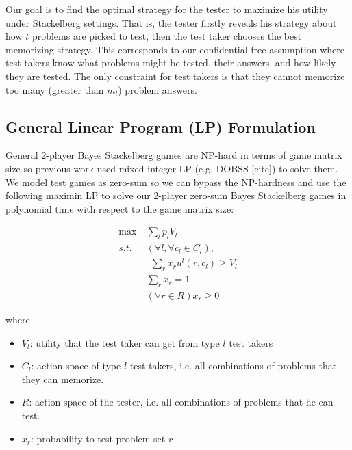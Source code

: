 \documentclass{article}
\begin{document}
Our goal is to find the optimal strategy for the tester to maximize his utility
under Stackelberg settings. That is, the tester firstly reveals his strategy
about how $t$ problems are picked to test, then the test taker chooses the best
memorizing strategy. This corresponds to our confidential-free assumption where
test takers know what problems might be tested, their answers, and how likely
they are tested. The only constraint for test takers is that they cannot
memorize too many (greater than $m_l$) problem answers. 

\subsection{General Linear Program (LP) Formulation}

General 2-player Bayes Stackelberg games are NP-hard in terms of game matrix
size so previous work used mixed integer LP (e.g. DOBSS [cite]) to solve them.
We model test games as zero-sum so we can bypass the NP-hardness and use the
following maximin LP to solve our 2-player zero-sum Bayes Stackelberg games in
polynomial time with respect to the game matrix size:

\begin{align}\label{eqn:maximin}
	\max~ &\sum_l p_l V_l \\
	s.t.~ &(\forall l, \forall c_l \in C_l),\nonumber\\
	&~~ \sum_r x_r u^l(r, c_l) \geq V_l\nonumber\\
	&\sum_r x_r = 1\nonumber\\
	&(\forall r \in R) x_r \geq 0\nonumber
\end{align}

where 
\begin{itemize}

 \item $V_l$: utility that the test taker can get from type $l$ test takers

 \item $C_l$: action space of type $l$ test takers, i.e. all combinations of
 problems that they can memorize.

 \item $R$: action space of the tester, i.e. all combinations of problems that
 he can test.
 
 \item $x_r$: probability to test problem set $r$

\end{itemize}
\end{document}
